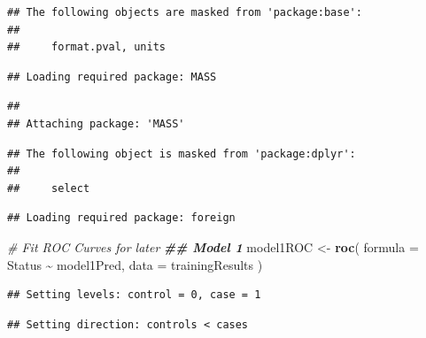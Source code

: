 \documentclass[
]{article}
\newenvironment{Shaded}{\begin{snugshade}}{\end{snugshade}}
\newcommand{\AttributeTok}[1]{\textcolor[rgb]{0.13,0.29,0.53}{#1}}
\newcommand{\CommentTok}[1]{\textcolor[rgb]{0.56,0.35,0.01}{\textit{#1}}}
\newcommand{\DocumentationTok}[1]{\textcolor[rgb]{0.56,0.35,0.01}{\textbf{\textit{#1}}}}
\newcommand{\FunctionTok}[1]{\textcolor[rgb]{0.13,0.29,0.53}{\textbf{#1}}}
\newcommand{\NormalTok}[1]{#1}
\newcommand{\OtherTok}[1]{\textcolor[rgb]{0.56,0.35,0.01}{#1}}
\newcommand{\SpecialCharTok}[1]{\textcolor[rgb]{0.81,0.36,0.00}{\textbf{#1}}}
\newcommand{\StringTok}[1]{\textcolor[rgb]{0.31,0.60,0.02}{#1}}
\begin{document}
\begin{verbatim}
## The following objects are masked from 'package:base':
## 
##     format.pval, units
\end{verbatim}

\begin{verbatim}
## Loading required package: MASS
\end{verbatim}

\begin{verbatim}
## 
## Attaching package: 'MASS'
\end{verbatim}

\begin{verbatim}
## The following object is masked from 'package:dplyr':
## 
##     select
\end{verbatim}

\begin{verbatim}
## Loading required package: foreign
\end{verbatim}

\begin{Shaded}
\begin{Highlighting}[]
\CommentTok{\# Fit ROC Curves for later}
\DocumentationTok{\#\# Model 1}
\NormalTok{model1ROC }\OtherTok{\textless{}{-}} \FunctionTok{roc}\NormalTok{(}
  \AttributeTok{formula =}\NormalTok{ Status }\SpecialCharTok{\textasciitilde{}}\NormalTok{ model1Pred,}
  \AttributeTok{data =}\NormalTok{ trainingResults}
\NormalTok{)}
\end{Highlighting}
\end{Shaded}

\begin{verbatim}
## Setting levels: control = 0, case = 1
\end{verbatim}

\begin{verbatim}
## Setting direction: controls < cases
\end{verbatim}

\begin{Shaded}
\end{Shaded}
\end{document}
